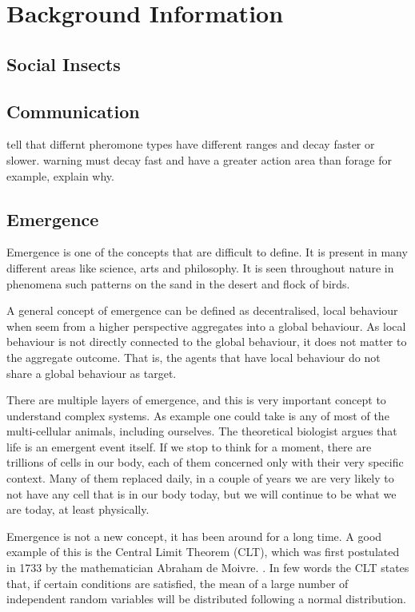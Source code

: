\chapter{Background Information}
\label{ch:background-information}

\section {Social Insects}
\section {Communication}
\label{sec:ant-comm}

tell that differnt pheromone types have different ranges and decay faster or slower.
warning must decay fast and have a greater action area than forage for example, explain why.

\section{Emergence}

Emergence is one of the concepts that are difficult to define. It is present in many different areas like science, arts and philosophy. It is seen throughout nature in phenomena such patterns on the sand in the desert and flock of birds.

A general concept of emergence can be defined as decentralised, local behaviour when seem from a higher perspective aggregates into a global behaviour. As local behaviour is not directly connected to the global behaviour, it does not matter to the aggregate outcome. That is, the agents that have local behaviour do not share a global behaviour as target.

There are multiple layers of emergence, and this is very important concept to understand complex systems.\cite{miller2007complex} As example one could take is any of most of the multi-cellular animals, including ourselves. The theoretical biologist \citeauthor{life1010034} argues that life is an emergent event itself. If we stop to think for a moment, there are trillions of cells in our body, each of them concerned only with their very specific context. Many of  them replaced daily, in a couple of years we are very likely to not have any cell that is in our body today, but we will continue to be what we are today, at least physically.

Emergence is not a new concept, it has been around for a long time. A good example of this is the Central Limit Theorem (CLT), which was first postulated in 1733 by the mathematician Abraham de Moivre. \cite{tijms2007understanding}. In few words the CLT states that, if certain conditions are satisfied, the mean of a large number of independent random variables will be distributed following a normal distribution.

